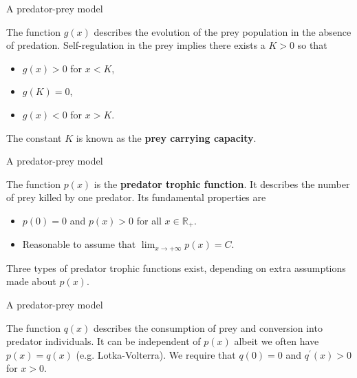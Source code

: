 \documentclass[usenames,dvipsnames,svgnames,10pt,aspectratio=169]{beamer}
\begin{document}
\begin{frame}[t, c]{A predator-prey model}{}
  \begin{minipage}{.68\textwidth}
    The function $g(x)$ describes the evolution of the prey population in the absence of predation.
    Self-regulation in the prey implies there exists a $K > 0$ so that

    \begin{itemize}
    \item $g(x) > 0$ for $x < K$,
    \item $g(K) = 0$,
    \item $g(x) < 0$ for $x > K$.
    \end{itemize}

    \medskip

    The constant $K$ is known as the \alert{\textbf{prey carrying capacity}}.
  \end{minipage}%
  \hfill
  \begin{minipage}{.28\textwidth}
  \end{minipage}
\end{frame}

\begin{frame}[t, c]{A predator-prey model}{}
  \begin{minipage}{.68\textwidth}
    The function $p(x)$ is the \alert{\textbf{predator trophic function}}.
    It describes the number of prey killed by one predator.
    Its fundamental properties are

    \begin{itemize}
    \item $p(0) = 0$ and $p(x) > 0$ for all $x \in \mathbb{R}_+$.
    \item Reasonable to assume that $\displaystyle \lim_{x \to +\infty} p(x) = C$.
    \end{itemize}

    \medskip

    Three types of predator trophic functions exist, depending on extra assumptions made about $p(x)$.

  \end{minipage}%
  \hfill
  \begin{minipage}{.28\textwidth}
  \end{minipage}
\end{frame}

\begin{frame}[t, c]{A predator-prey model}{}
  \begin{minipage}{.68\textwidth}
    The function $q(x)$ describes the consumption of prey and conversion into predator individuals.
    It can be independent of $p(x)$ albeit we often have $p(x) = q(x)$ (e.g. Lotka-Volterra).
    We require that $q(0) = 0$ and $q^{\prime}(x) > 0$ for $x > 0$.
  \end{minipage}%
  \hfill
  \begin{minipage}{.28\textwidth}
  \end{minipage}
\end{frame}
\end{document}
